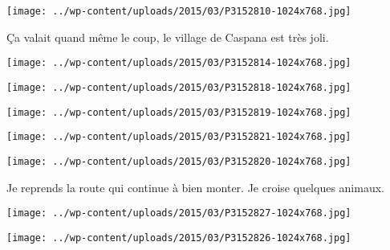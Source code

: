  

 

\begin{center} \texttt{[image: ../wp-content/uploads/2015/03/P3152810-1024x768.jpg]} \end{center}



 Ça valait quand même le coup, le village de Caspana est très joli.

 

\begin{center} \texttt{[image: ../wp-content/uploads/2015/03/P3152814-1024x768.jpg]} \end{center}

 

\begin{center} \texttt{[image: ../wp-content/uploads/2015/03/P3152818-1024x768.jpg]} \end{center}

 

\begin{center} \texttt{[image: ../wp-content/uploads/2015/03/P3152819-1024x768.jpg]} \end{center}

 

\begin{center} \texttt{[image: ../wp-content/uploads/2015/03/P3152821-1024x768.jpg]} \end{center}

 

\begin{center} \texttt{[image: ../wp-content/uploads/2015/03/P3152820-1024x768.jpg]} \end{center}

 

 Je reprends la route qui continue à bien monter. Je croise quelques animaux.

 

\begin{center} \texttt{[image: ../wp-content/uploads/2015/03/P3152827-1024x768.jpg]} \end{center}



 

\begin{center} \texttt{[image: ../wp-content/uploads/2015/03/P3152826-1024x768.jpg]} \end{center}



